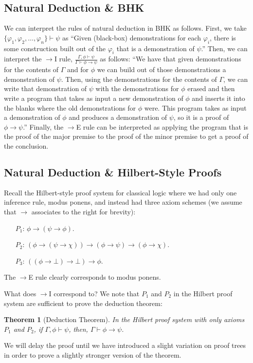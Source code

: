 \documentclass[12pt]{article}
\newtheorem{theorem}{Theorem}
\begin{document}
\subsection{Natural Deduction \& BHK}
We can interpret the rules of natural deduction in BHK as follows. First, we take $\{\varphi_1,\varphi_2,\dots,\varphi_n\}\vdash \psi$ as 
``Given (black-box) demonstrations for each $\varphi_i$, there is some construction built out of the $\varphi_i$ that is a demonstration of $\psi$.''
Then, we can interpret the $\to$I rule, $\frac{\Gamma,\phi\vdash\psi}{\Gamma\vdash\phi\to\psi}$ as follows: 
``We have that given demonstrations for the contents of $\Gamma$ and for $\phi$ we can build out of those demonstrations a demonstration of $\psi$. 
Then, using the demonstrations for the contents of $\Gamma$, we can write that demonstration of $\psi$ with the demonstrations for $\phi$ erased 
and then write a program that takes as input a new demonstration of $\phi$ and inserts it into the blanks where the old demonstrations for $\phi$ were.  
This program takes as input a demonstration of $\phi$ and produces a demonstration of $\psi$, so it is a proof of $\phi\to\psi$.''
Finally, the $\to$E rule can be interpreted as applying the program that is the proof of the major premise to the proof of the minor premise 
to get a proof of the conclusion. 

\subsection{Natural Deduction \& Hilbert-Style Proofs}
Recall the Hilbert-style proof system for classical logic where we had only one inference rule, modus ponens, and instead had three axiom schemes
(we assume that $\to$ associates to the right for brevity):
\begin{itemize}
\item[$P_1$:] $\phi\to(\psi\to\phi)$. 
\item[$P_2$:] $(\phi\to(\psi\to\chi)) \to (\phi\to\psi)\to(\phi\to\chi)$.
\item[$P_3$:] $((\phi\to\bot)\to\bot)\to\phi$. 
\end{itemize}
The $\to$E rule clearly corresponds to modus ponens. 

What does $\to$I correspond to? We note that $P_1$ and $P_2$ in the Hilbert proof system are sufficient to prove the deduction theorem: 
\begin{theorem}[Deduction Theorem]
In the Hilbert proof system with only axioms $P_1$ and $P_2$, if $\Gamma,\phi\vdash\psi$, then, $\Gamma\vdash\phi\to\psi$.
\end{theorem}
We will delay the proof until we have introduced a slight variation on proof trees in order to prove a slightly stronger version of the theorem.
 
\end{document}
